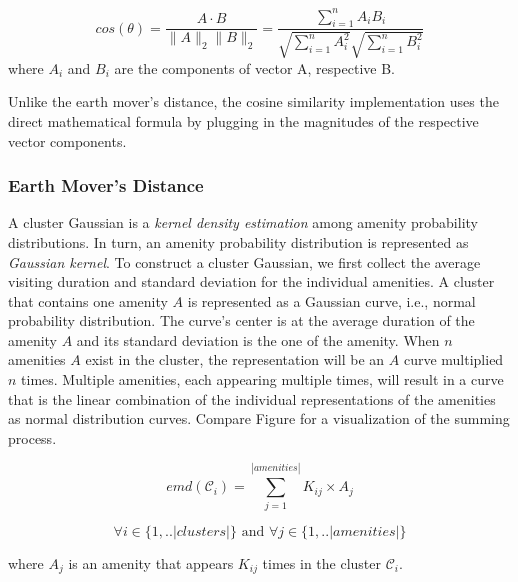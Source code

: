 \begin{equation}
cos(\theta)=\frac{A\cdot B}{{\lVert}A{\rVert}       
	_2{\lVert}B{\rVert}_2}=\frac{\sum_{i=1}^n{A_iB_i}}{\sqrt{\sum_{i=1}^n{A_i^2}}\sqrt{\sum_{i=1}^n{B_i^2}}}
\end{equation}
where $A_i$ and $B_i$ are the components of vector A, respective B. 

Unlike the earth mover's distance, the cosine similarity implementation uses the direct mathematical formula by plugging in the magnitudes of the respective vector components.

\subsubsection{Earth Mover's Distance}
\label{realization:gaussians}

A cluster Gaussian is a \textit{kernel density estimation} among amenity probability distributions.
In turn, an amenity probability distribution is represented as \textit{Gaussian kernel}.
To construct a cluster Gaussian, we first collect the average visiting duration and standard deviation for the individual amenities.
A cluster that contains one amenity $A$ is represented as a Gaussian curve, i.e., normal probability distribution.
The curve's center is at the average duration of the amenity $A$ and its standard deviation is the one of the amenity.
When $n$ amenities $A$ exist in the cluster, the representation will be an $A$ curve multiplied $n$ times.
Multiple amenities, each appearing multiple times, will result in a curve that is the linear combination of the individual representations of the amenities as normal distribution curves.
Compare Figure  for a visualization of the summing process.

\begin{equation}
emd(\mathcal{C}_i) = \sum_{j=1}^{|amenities|} K_{ij} \times A_j
\end{equation}

$$\forall i \in \{1,..|clusters|\} \text{ and } \forall j \in \{1,..|amenities|\}$$

where $A_j$ is an amenity that appears $K_{ij}$ times in the cluster $\mathcal{C}_i$.

